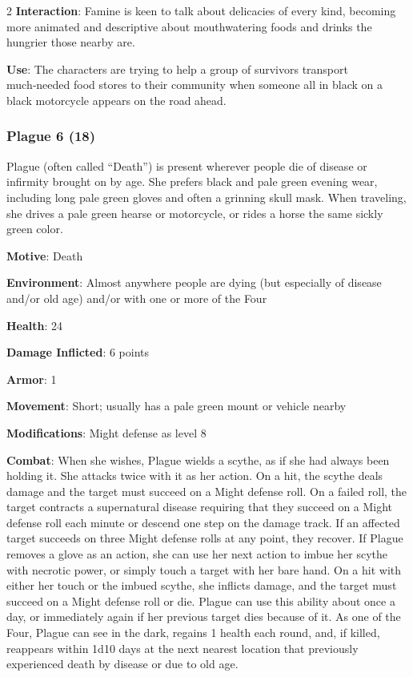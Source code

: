 \begin{multicols}{2}
\textbf{Interaction}: Famine is keen to talk about delicacies of every kind, becoming more animated and descriptive about mouthwatering foods and drinks the hungrier those nearby are.

\textbf{Use}: The characters are trying to help a group of survivors transport much‑needed food stores to their community when someone all in black on a black motorcycle appears on the road ahead.

\subsubsection{Plague 6 (18)}

Plague (often called “Death”) is present wherever people die of disease or infirmity brought on by age. She prefers black and pale green evening wear, including long pale green gloves and often a grinning skull mask. When traveling, she drives a pale green hearse or motorcycle, or rides a horse the same sickly green color.

\textbf{Motive}: Death

\textbf{Environment}: Almost anywhere people are dying (but especially of disease and/or old age) and/or with one or more of the Four

\textbf{Health}: 24

\textbf{Damage Inflicted}: 6 points

\textbf{Armor}: 1

\textbf{Movement}: Short; usually has a pale green mount or vehicle nearby

\textbf{Modifications}: Might defense as level 8

\textbf{Combat}: When she wishes, Plague wields a scythe, as if she had always been holding it. She attacks twice with it as her action. On a hit, the scythe deals damage and the target must succeed on a Might defense roll. On a failed roll, the target contracts a supernatural disease requiring that they succeed on a Might defense roll each minute or descend one step on the damage track. If an affected target succeeds on three Might defense rolls at any point, they recover. If Plague removes a glove as an action, she can use her next action to imbue her scythe with necrotic power, or simply touch a target with her bare hand. On a hit with either her touch or the imbued scythe, she inflicts damage, and the target must succeed on a Might defense roll or die. Plague can use this ability about once a day, or immediately again if her previous target dies because of it. As one of the Four, Plague can see in the dark, regains 1 health each round, and, if killed, reappears within 1d10 days at the next nearest location that previously experienced death by disease or due to old age.


\end{multicols}
